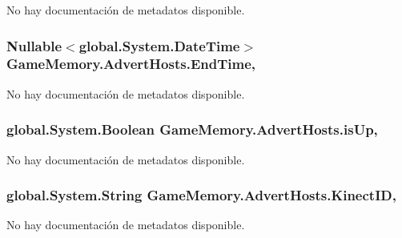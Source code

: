 No hay documentación de metadatos disponible. 

\hypertarget{class_game_memory_1_1_advert_hosts_a565c137468bd134b1fa5c32a9f32f9c0}{
\subsubsection[{End\-Time}]{\setlength{\rightskip}{0pt plus 5cm}Nullable$<$global.\-System.\-Date\-Time$>$ Game\-Memory.\-Advert\-Hosts.\-End\-Time\hspace{0.3cm}{\ttfamily [get]}, {\ttfamily [set]}}}\label{class_game_memory_1_1_advert_hosts_a565c137468bd134b1fa5c32a9f32f9c0}


No hay documentación de metadatos disponible. 

\hypertarget{class_game_memory_1_1_advert_hosts_a8d5395f4cef95ff9558134b2c37feb6b}{
\subsubsection[{is\-Up}]{\setlength{\rightskip}{0pt plus 5cm}global.\-System.\-Boolean Game\-Memory.\-Advert\-Hosts.\-is\-Up\hspace{0.3cm}{\ttfamily [get]}, {\ttfamily [set]}}}\label{class_game_memory_1_1_advert_hosts_a8d5395f4cef95ff9558134b2c37feb6b}


No hay documentación de metadatos disponible. 

\hypertarget{class_game_memory_1_1_advert_hosts_ac6a05cfb2749577b3b7918777ef0f820}{
\subsubsection[{Kinect\-I\-D}]{\setlength{\rightskip}{0pt plus 5cm}global.\-System.\-String Game\-Memory.\-Advert\-Hosts.\-Kinect\-I\-D\hspace{0.3cm}{\ttfamily [get]}, {\ttfamily [set]}}}\label{class_game_memory_1_1_advert_hosts_ac6a05cfb2749577b3b7918777ef0f820}


No hay documentación de metadatos disponible. 

